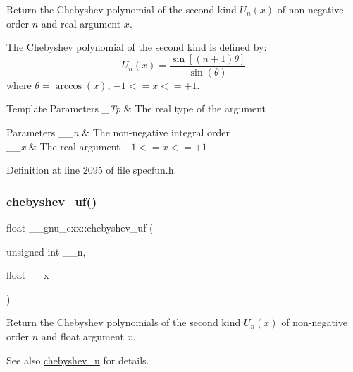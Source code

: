 Return the Chebyshev polynomial of the second kind $ U_n(x) $ of non-\/negative order $ n $ and real argument $ x $.

The Chebyshev polynomial of the second kind is defined by\+: \[ U_n(x) = \frac{\sin \left[(n+1)\theta \right]}{\sin(\theta)} \] where $ \theta = \arccos(x) $, $ -1 <= x <= +1 $.


\begin{DoxyTemplParams}{Template Parameters}
{\em \+\_\+\+Tp} & The real type of the argument \\
\hline
\end{DoxyTemplParams}

\begin{DoxyParams}{Parameters}
{\em \+\_\+\+\_\+n} & The non-\/negative integral order \\
\hline
{\em \+\_\+\+\_\+x} & The real argument $ -1 <= x <= +1 $ \\
\hline
\end{DoxyParams}


Definition at line 2095 of file specfun.\+h.

\mbox{\label{group__gnu__math__spec__func_ga4b28c2a079eae2e9612c9902801ca256}} 
\subsubsection{\texorpdfstring{chebyshev\+\_\+uf()}{chebyshev\_uf()}}
{\footnotesize\ttfamily float \+\_\+\+\_\+gnu\+\_\+cxx\+::chebyshev\+\_\+uf (\begin{DoxyParamCaption}\item[{unsigned int}]{\+\_\+\+\_\+n,  }\item[{float}]{\+\_\+\+\_\+x }\end{DoxyParamCaption})\hspace{0.3cm}{\ttfamily [inline]}}

Return the Chebyshev polynomials of the second kind $ U_n(x) $ of non-\/negative order $ n $ and {\ttfamily float} argument $ x $.

\begin{DoxySeeAlso}{See also}
\hyperlink{group__gnu__math__spec__func_gafa90c06bdedb8459f20576297cf1608f}{chebyshev\+\_\+u} for details. 
\end{DoxySeeAlso}


